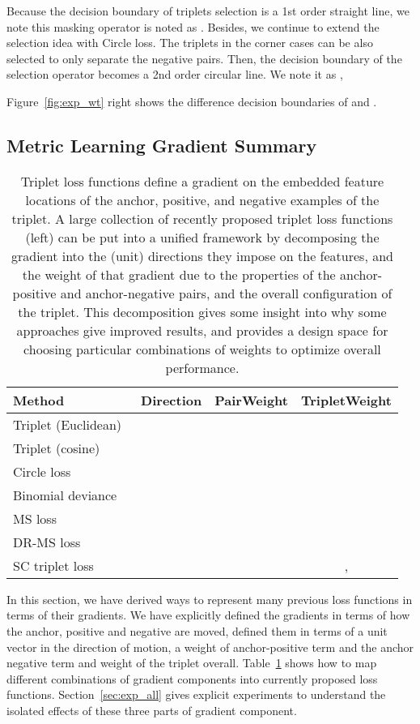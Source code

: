 \documentclass[10pt,twocolumn,letterpaper]{article}
\begin{document}
Because the decision boundary of triplets selection   is a 1st order straight line, we note this masking operator is noted as .  Besides, we continue to extend the selection idea with Circle loss. The triplets in the corner cases can be also selected to only separate the negative pairs. Then, the decision boundary of the selection operator becomes a 2nd order circular line. We note it as , 

Figure~\ref{fig:exp_wt} right shows the difference decision boundaries of  and .

\subsection{Metric Learning Gradient Summary}
\begin{table}[t]
\centering
\begin{adjustbox}{width=1\columnwidth}
\begin{tabular}{l|c|c|c}
Method & Direction & PairWeight & TripletWeight \\
\hline
Triplet (Euclidean)~\cite{facenet}
&       &     &  \\
Triplet (cosine)~\cite{Xuan_2020_WACV}
&       &     &  \\
Circle loss~\cite{Sun_2020_CVPR}
&       &     &  \\
Binomial deviance~\cite{yi2014deep}
&       &     &  \\
MS loss~\cite{wang2019multi}
&       &  &  \\
DR-MS loss~\cite{Mohan_2020_CVPR}
&  &  &  \\
SC triplet loss~\cite{Xuan_2020_ECCV}
&       &    & ,  \\
\hline
\end{tabular}
\end{adjustbox}
\caption{Triplet loss functions define a gradient on the embedded feature locations of the anchor, positive, and negative examples of the triplet.  A large collection of recently proposed triplet loss functions (left) can be put into a unified framework by decomposing the gradient into the (unit) directions they impose on the features, and the weight of that gradient due to the properties of the anchor-positive and anchor-negative pairs, and the overall configuration of the triplet.  This decomposition gives some insight into why some approaches give improved results, and provides a design space for choosing particular combinations of weights to optimize overall performance.}
\label{table:methods}
\end{table} In this section, we have derived ways to represent many previous loss functions in terms of their gradients.  We have explicitly defined the gradients in terms of how the anchor, positive and negative are moved, defined them in terms of a unit vector in the direction of motion, a weight of anchor-positive term and the anchor negative term and weight of the triplet overall. Table~\ref{table:methods} shows how to map different combinations of gradient components into currently proposed loss functions. Section~\ref{sec:exp_all} gives explicit experiments to understand the isolated effects of these three parts of gradient component.
\end{document}
